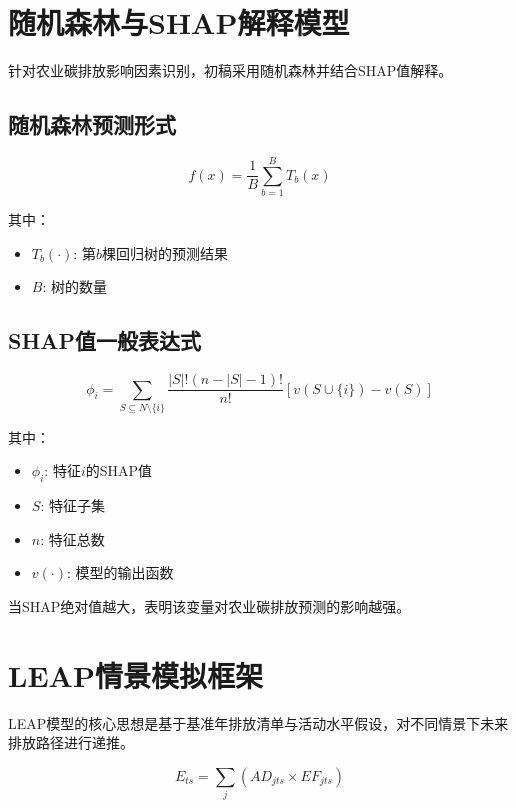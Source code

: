 \documentclass{article}
\begin{document}
\section{随机森林与SHAP解释模型}

针对农业碳排放影响因素识别，初稿采用随机森林并结合SHAP值解释。

\subsection{随机森林预测形式}

\begin{equation}
f(x) = \frac{1}{B} \sum_{b=1}^{B} T_b(x)
\end{equation}

其中：
\begin{itemize}
\item $T_b(\cdot)$: 第$b$棵回归树的预测结果
\item $B$: 树的数量
\end{itemize}

\subsection{SHAP值一般表达式}

\begin{equation}
\phi_i = \sum_{S \subseteq N \setminus \{i\}} \frac{|S|!(n-|S|-1)!}{n!} \left[ v(S \cup \{i\}) - v(S) \right]
\end{equation}

其中：
\begin{itemize}
\item $\phi_i$: 特征$i$的SHAP值
\item $S$: 特征子集
\item $n$: 特征总数
\item $v(\cdot)$: 模型的输出函数
\end{itemize}

当SHAP绝对值越大，表明该变量对农业碳排放预测的影响越强。

\section{LEAP情景模拟框架}

LEAP模型的核心思想是基于基准年排放清单与活动水平假设，对不同情景下未来排放路径进行递推。

\begin{equation}
E_{ts} = \sum_{j} (AD_{jts} \times EF_{jts})
\end{equation}
\end{document}
